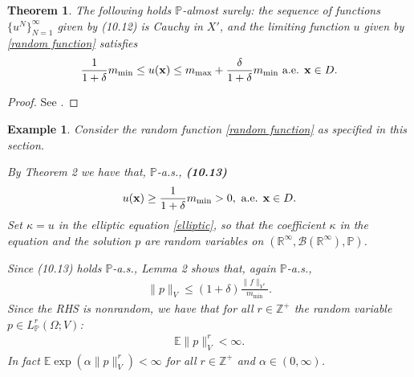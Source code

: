 \documentclass[oneside,11pt]{book}
\numberwithin{equation}{section}
\newtheorem{theorem}{Theorem}[section]
\newtheorem{example}{Example}[section]
\begin{document}
\begin{theorem}
    The following holds $\mathbb{P}$-almost surely: the sequence of functions $\{u^N\}_{N=1}^\infty$ given by (10.12) is Cauchy in $X'$, and the limiting function $u$ given by \eqref{random function} satisfies
    \begin{align*}
        \frac{1}{1 + \delta}m_{\min}\le u({\bf x})\le m_{\max} + \frac{\delta}{1 + \delta}m_{\min} \mbox{ a.e. } {\bf x}\in D.
    \end{align*}
\end{theorem}

\begin{proof}
    See \cite[pp. 322--323]{Dashti_Stuart2017}.
\end{proof}

\begin{example}
    Consider the random function \eqref{random function} as specified in this section.
    
    By Theorem 2 we have that, $\mathbb{P}$-a.s., \textbf{(10.13)}
    \begin{align*}
        u({\bf x})\ge\frac{1}{1 + \delta}m_{\min} > 0, \mbox{ a.e. } {\bf x}\in D.
    \end{align*}
    Set $\kappa = u$ in the elliptic equation \eqref{elliptic}, so that the coefficient $\kappa$ in the equation and the solution $p$ are random variables on $(\mathbb{R}^\infty,\mathcal{B}(\mathbb{R}^\infty),\mathbb{P})$.
    
    Since (10.13) holds $\mathbb{P}$-a.s., Lemma 2 shows that, again $\mathbb{P}$-a.s.,
    \begin{align*}
        \|p\|_V\le(1 + \delta)\frac{\|f\|_{V^*}}{m_{\min}}.
    \end{align*}
    Since the RHS is nonrandom, we have that for all $r\in\mathbb{Z}^+$ the random variable $p\in L_{\mathbb{P}}^r(\Omega;V)$:
    \begin{align*}
        \mathbb{E}\|p\|_V^r < \infty.
    \end{align*}
    In fact $\mathbb{E}\exp(\alpha\|p\|_V^r) < \infty$ for all $r\in\mathbb{Z}^+$ and $\alpha\in(0,\infty)$.
\end{example}
\end{document}
